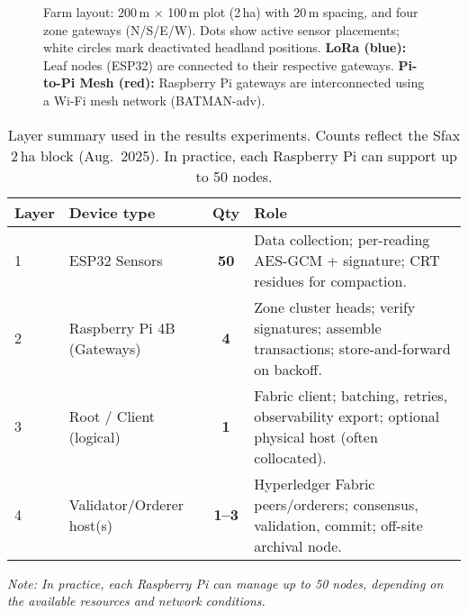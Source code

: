 \documentclass[12pt,onecolumn]{IEEEtran} %
\begin{document}
\begin{figure}[htbp]
\begin{adjustbox}{max width=\textwidth, max height=0.9\textheight, keepaspectratio}
\end{adjustbox}

\caption{Farm layout: 200\,m $\times$ 100\,m plot (2\,ha) with 20\,m spacing, and four zone gateways (N/S/E/W).
Dots show active sensor placements; white circles mark deactivated headland positions.
\textbf{LoRa (blue):} Leaf nodes (ESP32) are connected to their respective gateways.
\textbf{Pi-to-Pi Mesh (red):} Raspberry Pi gateways are interconnected using a Wi-Fi mesh network (BATMAN-adv).}
\label{fig:farm-layout}
\end{figure}



\begin{table}[htbp]
  \centering
  \caption{Layer summary used in the results experiments. Counts reflect the Sfax 2\,ha block (Aug.\ 2025). In practice, each Raspberry Pi can support up to 50 nodes.}
  \label{tab:results-layer-summary}
  \begin{tabularx}{\linewidth}{l l c X}
    \toprule
    \textbf{Layer} & \textbf{Device type} & \textbf{Qty} & \textbf{Role} \\
    \midrule
    1 & ESP32 Sensors & \textbf{50} & Data collection; per-reading AES-GCM + signature; CRT residues for compaction. \\
    2 & Raspberry Pi 4B (Gateways) & \textbf{4} & Zone cluster heads; verify signatures; assemble transactions; store-and-forward on backoff. \\
    3 & Root / Client (logical) & \textbf{1} & Fabric client; batching, retries, observability export; optional physical host (often collocated). \\
    4 & Validator/Orderer host(s) & \textbf{1--3} & Hyperledger Fabric peers/orderers; consensus, validation, commit; off-site archival node. \\
    \bottomrule
  \end{tabularx}
  \vspace{1em}
  \footnotesize
  \textit{Note: In practice, each Raspberry Pi can manage up to 50 nodes, depending on the available resources and network conditions.}
\end{table}
\end{document}
